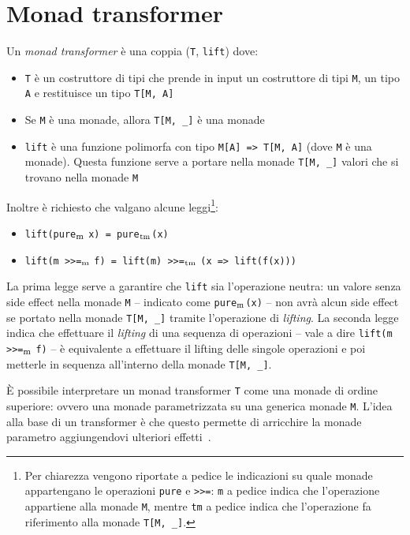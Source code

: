 \section{Monad transformer}

Un \emph{monad transformer} è una coppia (\lstinline{T}, \lstinline{lift}) dove:
\begin{itemize}
  \item \lstinline{T} è un costruttore di tipi che prende in input un costruttore di tipi \lstinline{M}, un tipo \lstinline{A} e restituisce un tipo \lstinline{T[M, A]}
  \item Se \lstinline{M} è una monade, allora \lstinline{T[M, _]} è una monade
  \item \lstinline{lift} è una funzione polimorfa con tipo \lstinline{M[A] => T[M, A]} (dove \lstinline{M} è una monade). Questa funzione serve a portare nella monade \lstinline{T[M, _]} valori che si trovano nella monade \lstinline{M}
\end{itemize}

Inoltre è richiesto che valgano alcune leggi\footnote{Per chiarezza vengono riportate a pedice le indicazioni su quale monade appartengano le operazioni \lstinline{pure} e \lstinline{>>=}: \lstinline{m} a pedice indica che l'operazione appartiene alla monade \lstinline{M}, mentre \lstinline{tm} a pedice indica che l'operazione fa riferimento alla monade \lstinline{T[M, _]}.}:
\begin{itemize}
  \item \lstinline{lift(pure}$_\text{\lstinline{m}}$ \lstinline{x) = pure}$_\text{\lstinline{tm}}$\lstinline{(x)}
  \item \lstinline{lift(m >>=}$_\text{\lstinline{m}}$ \lstinline{f) = lift(m) >>=}$_\text{\lstinline{tm}}$ \lstinline{(x => lift(f(x)))}
\end{itemize}

La prima legge serve a garantire che \lstinline{lift} sia l'operazione neutra: un valore senza side effect nella monade \lstinline{M} -- indicato come \lstinline{pure}$_\text{\lstinline{m}}$\lstinline{(x)} -- non avrà alcun side effect se portato nella monade \lstinline{T[M, _]} tramite l'operazione di \emph{lifting}. La seconda legge indica che effettuare il \emph{lifting} di una sequenza di operazioni -- vale a dire \lstinline{lift(m >>=}$_\text{\lstinline{m}}$ \lstinline{f)} -- è equivalente a effettuare il lifting delle singole operazioni e poi metterle in sequenza all'interno della monade \lstinline{T[M, _]}.

È possibile interpretare un monad transformer \lstinline{T} come una monade di ordine superiore: ovvero una monade parametrizzata su una generica monade \lstinline{M}. L'idea alla base di un transformer è che questo permette di arricchire la monade parametro aggiungendovi ulteriori effetti~\cite{cit:monad-transformers-and-modular-interpreters}.

